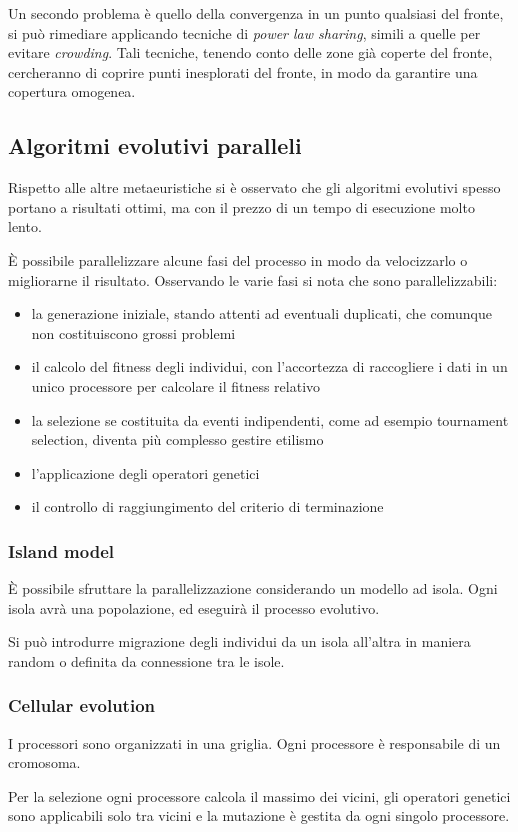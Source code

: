 \documentclass[a4paper]{article}
\begin{document}
Un secondo problema è quello della convergenza in un punto qualsiasi del fronte, 
si può rimediare applicando tecniche di \emph{power law sharing}, simili a quelle 
per evitare \emph{crowding}. Tali tecniche, tenendo conto delle zone già 
coperte del fronte, cercheranno di coprire punti inesplorati del fronte, 
in modo da garantire una copertura omogenea.

\subsection{Algoritmi evolutivi paralleli}
Rispetto alle altre metaeuristiche si è osservato che gli algoritmi evolutivi spesso
portano a risultati ottimi, ma con il prezzo di un tempo di esecuzione molto lento.

È possibile parallelizzare alcune fasi del processo in modo da 
velocizzarlo o migliorarne il risultato.
Osservando le varie fasi si nota che sono parallelizzabili:
\begin{itemize}
    \item la generazione iniziale, stando attenti ad eventuali duplicati, 
    che comunque non costituiscono grossi problemi
    \item il calcolo del fitness degli individui, con l'accortezza di raccogliere i dati in un unico processore per 
    calcolare il fitness relativo
    \item la selezione se costituita da eventi indipendenti, come ad esempio tournament selection, 
    diventa più complesso gestire etilismo
    \item l'applicazione degli operatori genetici
    \item il controllo di raggiungimento del criterio di terminazione
\end{itemize}

\subsubsection{Island model}
È possibile sfruttare la parallelizzazione considerando un modello ad isola.
Ogni isola avrà una popolazione, ed eseguirà il processo evolutivo.

Si può introdurre migrazione degli individui da un isola all'altra in maniera
random o definita da connessione tra le isole.

\subsubsection{Cellular evolution}
I processori sono organizzati in una griglia. Ogni processore è responsabile di un cromosoma.

Per la selezione ogni processore calcola il massimo dei vicini, gli operatori genetici sono applicabili 
solo tra vicini e la mutazione è gestita da ogni singolo processore.
\end{document}
